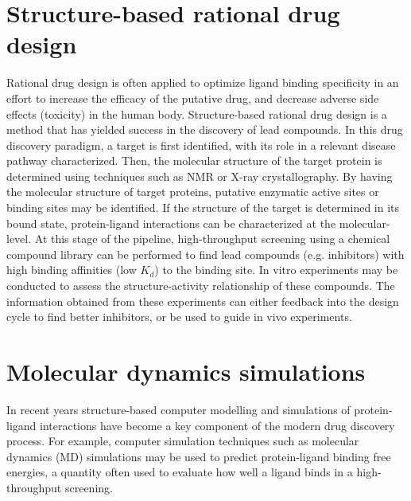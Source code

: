 \section{Structure-based rational drug design}
Rational drug design is often applied to optimize ligand binding specificity in an effort to increase the efficacy of the putative drug, and decrease adverse side effects (toxicity) in the human body.
Structure-based rational drug design is a method that has yielded success in the discovery of lead compounds.
In this drug discovery paradigm, a target is first identified, with its role in a relevant disease pathway characterized. Then, the molecular structure of the target protein is determined using techniques such as NMR or X-ray crystallography.  By having the molecular structure of target proteins, putative enzymatic active sites or binding sites may be identified.  If the structure of the target is determined in its bound state, protein-ligand interactions can be characterized at the molecular-level. At this stage of the pipeline, high-throughput screening using a chemical compound library can be performed to find lead compounds (e.g. inhibitors) with high binding affinities (low $K_d$) to the binding site. In vitro experiments may be conducted to assess the structure-activity relationship of these compounds.  The information obtained from these experiments can either feedback into the design cycle to find better inhibitors, or be used to guide in vivo experiments.


\section{Molecular dynamics simulations}

In recent years structure-based computer modelling and simulations of protein-ligand interactions have become a key component of the modern drug discovery process. For example, computer simulation techniques such as molecular dynamics (MD) simulations may be used to predict protein-ligand binding free energies,  a quantity often used to evaluate how well a ligand binds in a high-throughput screening.

